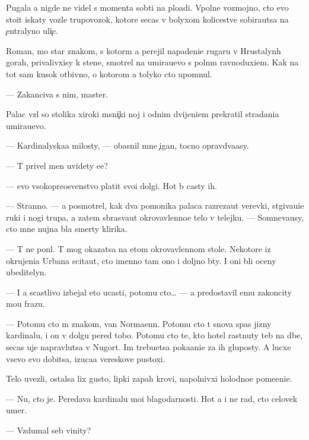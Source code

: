 \documentclass[10pt]{book}
\begin{document}
Pugala {\y}a nigde ne videl s momenta sob{\yi}ti{\y} na plo{\x}adi. Vpolne vozmojno, cto {\y}evo sto{\y}it iskaty vozle trupovozok, kotor{\yi}{\y}e se{\y}cas v bolyxom kolicestve sobira{\y}utsa na {\c}entralyno{\y} uli{\c}e.

Roman, mo{\y} star{\yi}{\y} znakom{\yi}{\y}, s kotor{\yi}m {\y}a perejil napadeni{\y}e rugaru v Hrustalyn{\yi}h gorah, privalivxisy k stene, smotrel na umira{\y}u{\x}evo s poln{\yi}m ravnoduxi{\y}em. Kak na tot sam{\yi}{\y} kusok otbivno{\y}, o kotorom {\y}a tolyko cto upom{\ia}nul.

— Zakanciva{\y} s nim, master.

Palac vz{\ia}l so stolika xiroki{\y} m{\ia}sni{\c}ki{\y} noj i odnim dvijeni{\y}em prekratil stradani{\y}a umira{\y}u{\x}evo.

— Kardinalyska{\y}a milosty, — ob{\y}asnil mne {\c}igan, tocno opravd{\yi}va{\y}asy.

— T{\yi} privel men{\ia} uvidety {\y}e{\y}e?

— {\Y}evo v{\yi}sokopreosv{\ia}{\x}enstvo platit svo{\y}i dolgi. Hot{\ia} b{\yi} casty ih.

— Stranno. — {\Y}a posmotrel, kak dva pomo{\x}nika palaca razreza{\y}ut verevki, st{\ia}giva{\y}u{\x}i{\y}e ruki i nogi trupa, a zatem sbras{\yi}va{\y}ut okrovavlenno{\y}e telo v telejku. — Somneva{\y}usy, cto mne nujna b{\yi}la smerty klirika.

— T{\yi} ne pon{\ia}l. T{\yi} mog okazatsa na etom okrovavlennom stole. Nekotor{\yi}{\y}e iz okrujeni{\y}a Urbana scita{\y}ut, cto imenno tam ono i doljno b{\yi}ty. I oni b{\yi}li oceny ubeditelyn{\yi}.

— I {\y}a scastlivo izbejal eto{\y} ucasti, potomu cto… — {\Y}a predostavil {\y}emu zakoncity mo{\y}u frazu.

— Potomu cto m{\yi} znakom{\yi}, van Normaenn. Potomu cto t{\yi} snova spas jizny kardinalu, i on v dolgu pered tobo{\y}. Potomu cto te, kto hotel rast{\ia}nuty teb{\ia} na d{\yi}be, se{\y}cas uje napravl{\ia}{\y}utsa v N{\y}ugort. Im trebu{\y}etsa poka{\y}ani{\y}e za ih gluposty. A lucxe vsevo {\y}evo dobitsa, izuca{\y}a vereskov{\yi}{\y}e pustoxi.

Telo uvezli, ostalsa lix gusto{\y}, lipki{\y} zapah krovi, napolnivxi{\y} holodno{\y}e pome{\x}eni{\y}e.

— Nu, cto je. Peredava{\y} kardinalu mo{\y}i blagodarnosti. Hot{\ia} {\y}a i ne rad, cto celovek umer.

— Vzdumal seb{\ia} vinity?
\end{document}
